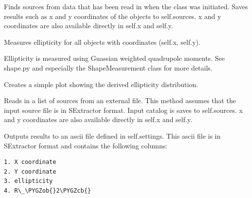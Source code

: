 \documentclass[a4paper,11pt,english]{sphinxmanual}
\def\PYGZob{\char`\{}
\def\PYGZcb{\char`\}}
\begin{document}
\begin{fulllineitems}
\begin{fulllineitems}
Finds sources from data that has been read in when the class was initiated.
Saves results such as x and y coordinates of the objects to self.sources.
x and y coordinates are also available directly in self.x and self.y.

\end{fulllineitems}


\begin{fulllineitems}
Measures ellipticity for all objects with coordinates (self.x, self.y).

Ellipticity is measured using Guassian weighted quadrupole moments.
See shape.py and especially the ShapeMeasurement class for more details.

\end{fulllineitems}


\begin{fulllineitems}
Creates a simple plot showing the derived ellipticity distribution.

\end{fulllineitems}


\begin{fulllineitems}
Reads in a list of sources from an external file. This method assumes
that the input source file is in SExtractor format. Input catalog is
saves to self.sources. x and y coordinates are also available directly in self.x and self.y.

\end{fulllineitems}


\begin{fulllineitems}
Outputs results to an ascii file defined in self.settings. This ascii file
is in SExtractor format and contains the following columns:

\begin{Verbatim}[commandchars=\\\{\}]
1. X coordinate
2. Y coordinate
3. ellipticity
4. R\_\PYGZob{}2\PYGZcb{}
\end{Verbatim}

\end{fulllineitems}


\end{fulllineitems}
\end{document}
